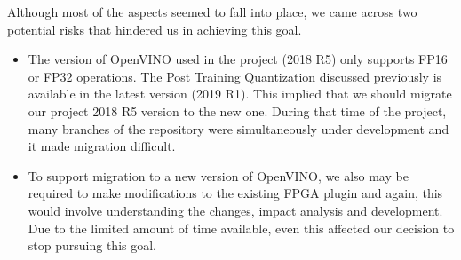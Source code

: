 Although most of the aspects seemed to fall into place, we came across two potential risks that hindered us in achieving this goal. 
		
\begin{itemize}
\item The version of OpenVINO used in the project (2018 R5) only supports FP16 or FP32 operations. The Post Training Quantization discussed previously is available in the latest version (2019 R1). This implied that we should migrate our project 2018 R5 version to the new one. During that time of the project, many branches of the repository were simultaneously under development and it made migration difficult. 
\item To support migration to a new version of OpenVINO, we also may be required to make modifications to the existing FPGA plugin and again, this would involve understanding the changes, impact analysis and development. Due to the limited amount of time available, even this affected our decision to stop pursuing this goal.
\end{itemize}
